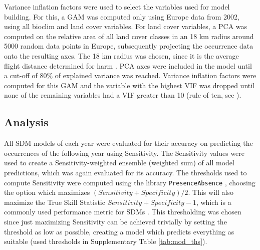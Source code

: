 \documentclass[12pt,a4paper]{article}
\begin{document}
Variance inflation factors were used to select the variables used for model building.
For this, a GAM was computed only using Europe data from 2002, using all bioclim and land cover variables.
For land cover variables, a PCA was computed on the relative area of all land cover classes in an 18 km radius around 5000 random data points in Europe, subsequently projecting the occurrence data onto the resulting axes.
The 18 km radius was chosen, since it is the average flight distance determined for \gls{harm} \autocite{jeffries2013flightharmonia}.
PCA axes were included in the model until a cut-off of 80\% of explained variance was reached.
Variance inflation factors were computed for this GAM and the variable with the highest VIF was dropped until none of the remaining variables had a VIF greater than 10 (rule of ten, see \cite{obrien2007cautionVIFs}).

\subsection{Analysis} \label{ssec:analysis}
All SDM models of each year were evaluated for their accuracy on predicting the occurrences of the following year using Sensitivity.
The Sensitivity values were used to create a Sensitivity-weighted ensemble (weighted sum) of all model predictions, which was again evaluated for its accuracy.
The thresholds used to compute Sensitivity were computed using the library \texttt{PresenceAbsence} \autocite{freeman2008presenceabsence}, choosing the option which maximizes $(Sensitivity + Specificity) / 2$.
This will also maximize the True Skill Statistic $Sensitivity + Specificity - 1$, which is a commonly used performance metric for SDMs \autocite{leroy2018TSSissues}.
This thresholding was chosen since just maximizing Sensitivity can be achieved trivially by setting the threshold as low as possible, creating a model which predicts everything as suitable (used thresholds in Supplementary Table \ref{tab:mod_ths}).
\end{document}
